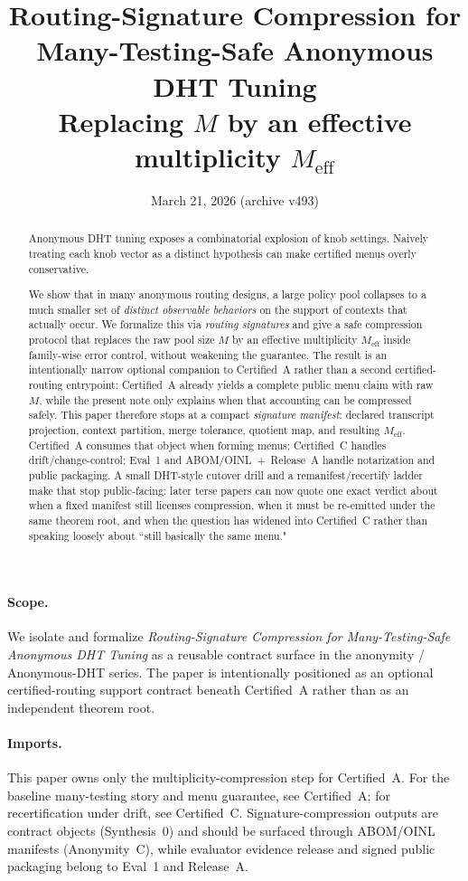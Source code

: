 \documentclass[11pt]{article}
\title{Routing-Signature Compression for Many-Testing-Safe Anonymous DHT Tuning\\
\large Replacing $M$ by an effective multiplicity $M_{\mathrm{eff}}$}
\author{}
\date{March 21, 2026 (archive v493)}
\begin{document}
\maketitle

\begin{abstract}
Anonymous DHT tuning exposes a combinatorial explosion of knob settings.
Naively treating each knob vector as a distinct hypothesis can make certified menus overly conservative.

We show that in many anonymous routing designs, a large policy pool collapses to a much smaller set of \emph{distinct observable behaviors} on the support of contexts that actually occur.
We formalize this via \emph{routing signatures} and give a safe compression protocol that replaces the raw pool size $M$ by an effective multiplicity $M_{\mathrm{eff}}$ inside family-wise error control, without weakening the guarantee.
The result is an intentionally narrow optional companion to Certified~A rather than a second certified-routing entrypoint: Certified~A already yields a complete public menu claim with raw $M$, while the present note only explains when that accounting can be compressed safely.
This paper therefore stops at a compact \emph{signature manifest}: declared transcript projection, context partition, merge tolerance, quotient map, and resulting $M_{\mathrm{eff}}$.
Certified~A consumes that object when forming menus; Certified~C handles drift/change-control; Eval~1 and ABOM/OINL~+~Release~A handle notarization and public packaging.
A small DHT-style cutover drill and a remanifest/recertify ladder make that stop public-facing: later terse papers can now quote one exact verdict about when a fixed manifest still licenses compression, when it must be re-emitted under the same theorem root, and when the question has widened into Certified~C rather than speaking loosely about ``still basically the same menu."
\end{abstract}

\paragraph{Scope.}
We isolate and formalize \emph{Routing-Signature Compression for Many-Testing-Safe Anonymous DHT Tuning} as a reusable contract surface in the anonymity / Anonymous-DHT series. The paper is intentionally positioned as an optional certified-routing support contract beneath Certified~A rather than as an independent theorem root.

\paragraph{Imports.}
This paper owns only the multiplicity-compression step for Certified~A.
For the baseline many-testing story and menu guarantee, see Certified~A; for recertification under drift, see Certified~C.\cite{series:certifiedmenus,series:recert}
Signature-compression outputs are contract objects (Synthesis~0) and should be surfaced through ABOM/OINL manifests (Anonymity~C), while evaluator evidence release and signed public packaging belong to Eval~1 and Release~A.\cite{series:contractobjects,series:abomoinl,series:eval1,series:releaseA}
\end{document}
